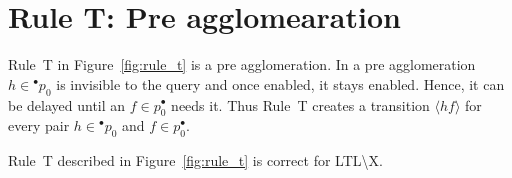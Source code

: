 \section*{Rule T: Pre agglomearation}\label{sec:rule_t}

Rule~T in Figure~\ref{fig:rule_t} is a pre agglomeration.
In a pre agglomeration $h\in{}^\bullet p_0$ is invisible to the query and once enabled, it stays enabled.
Hence, it can be delayed until an $f\in p_0^\bullet$ needs it.
Thus Rule~T creates a transition $\langle h f\rangle$ for every pair $h\in{}^\bullet p_0$ and $f\in p_0^\bullet$.

\begin{theorem}
    Rule~T described in Figure~\ref{fig:rule_t} is correct for LTL\textbackslash X.
\end{theorem}

